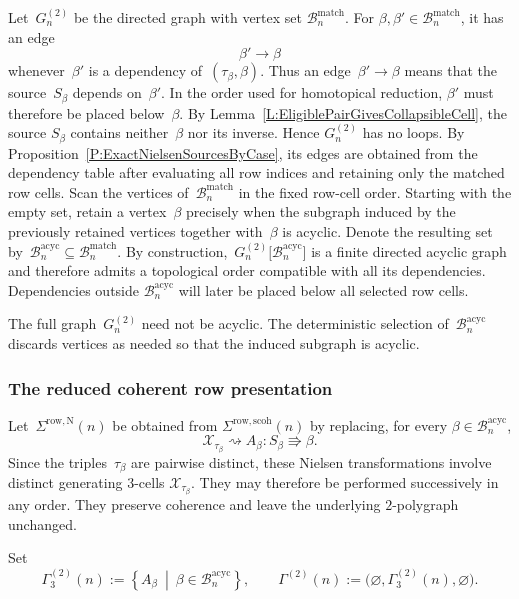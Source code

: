 \documentclass[a4paper, twoside, 11pt, english]{article}
\begin{document}
Let~$G_n^{(2)}$ be the directed graph with vertex set
$\mathcal B_n^{\mathrm{match}}$. For
$\beta,\beta'\in\mathcal B_n^{\mathrm{match}}$, it has an edge
\[
\beta'\longrightarrow\beta
\]
whenever~$\beta'$ is a dependency of~$(\tau_\beta,\beta)$. Thus an
edge~$\beta'\to\beta$ means that the source~$S_\beta$ depends
on~$\beta'$. In the order used for homotopical reduction, $\beta'$
must therefore be placed below~$\beta$.
By Lemma~\ref{L:EligiblePairGivesCollapsibleCell}, the source
$S_\beta$ contains neither~$\beta$ nor its inverse. Hence
$G_n^{(2)}$ has no loops. By
Proposition~\ref{P:ExactNielsenSourcesByCase}, its edges are obtained
from the dependency table after evaluating all row indices and
retaining only the matched row cells.
Scan the vertices of~$\mathcal B_n^{\mathrm{match}}$ in the fixed
row-cell order. Starting with the empty set, retain a vertex~$\beta$
precisely when the subgraph induced by the previously retained
vertices together with~$\beta$ is acyclic. Denote the resulting set by~$\mathcal B_n^{\mathrm{acyc}}
\subseteq
\mathcal B_n^{\mathrm{match}}$.
By construction,~$
G_n^{(2)}
\bigl[
\mathcal B_n^{\mathrm{acyc}}
\bigr]$
is a finite directed acyclic graph and therefore admits a topological
order compatible with all its dependencies. Dependencies outside
$\mathcal B_n^{\mathrm{acyc}}$ will later be placed below all selected
row cells.


\begin{remark}
The full graph~$G_n^{(2)}$ need not be acyclic. The deterministic
selection of~$\mathcal B_n^{\mathrm{acyc}}$ discards vertices as
needed so that the induced subgraph is acyclic.
\end{remark}

\subsubsection{The reduced coherent row presentation}

Let~$\Sigma^{\mathrm{row,N}}(n)$ be obtained from
$\Sigma^{\mathrm{row,scoh}}(n)$ by replacing, for every
$\beta\in\mathcal B_n^{\mathrm{acyc}}$,
\[
\mathcal X_{\tau_\beta}
\rightsquigarrow
A_\beta\colon
S_\beta\Rrightarrow\beta.
\]
Since the triples~$\tau_\beta$ are pairwise distinct, these Nielsen
transformations involve distinct generating $3$-cells
$\mathcal X_{\tau_\beta}$. They may therefore be performed successively
in any order. They preserve coherence and leave the underlying
$2$-polygraph unchanged.

Set
\[
\Gamma_3^{(2)}(n)
:=
\left\{
A_\beta
\ \middle|\
\beta\in\mathcal B_n^{\mathrm{acyc}}
\right\},
\qquad
\Gamma^{(2)}(n)
:=
\bigl(
\varnothing,
\Gamma_3^{(2)}(n),
\varnothing
\bigr).
\]
\end{document}
